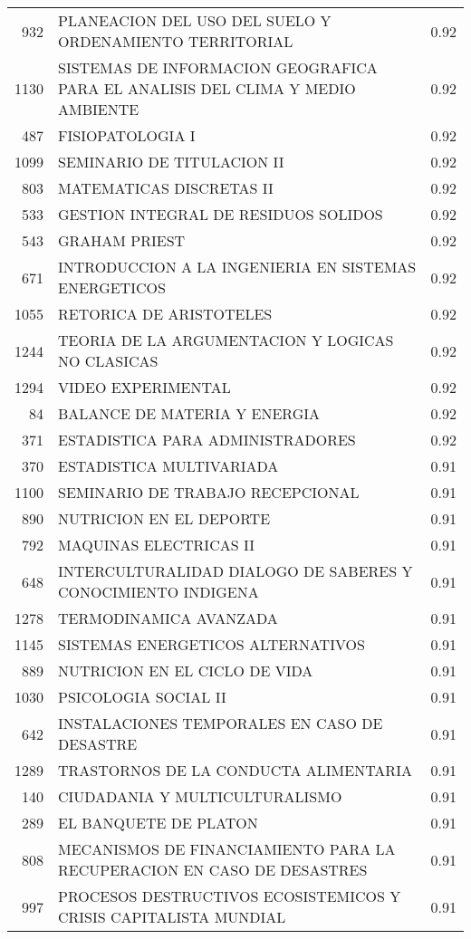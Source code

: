 \begin{table}[ht]
\begin{tabular}{rlr}
  932 & PLANEACION DEL USO DEL SUELO Y ORDENAMIENTO TERRITORIAL & 0.92 \\ 
  1130 & SISTEMAS DE INFORMACION GEOGRAFICA PARA EL ANALISIS DEL CLIMA Y MEDIO AMBIENTE & 0.92 \\ 
  487 & FISIOPATOLOGIA I & 0.92 \\ 
  1099 & SEMINARIO DE TITULACION II & 0.92 \\ 
  803 & MATEMATICAS DISCRETAS II & 0.92 \\ 
  533 & GESTION INTEGRAL DE RESIDUOS SOLIDOS & 0.92 \\ 
  543 & GRAHAM PRIEST & 0.92 \\ 
  671 & INTRODUCCION A LA INGENIERIA EN SISTEMAS ENERGETICOS & 0.92 \\ 
  1055 & RETORICA DE ARISTOTELES & 0.92 \\ 
  1244 & TEORIA DE LA ARGUMENTACION Y LOGICAS NO CLASICAS & 0.92 \\ 
  1294 & VIDEO EXPERIMENTAL & 0.92 \\ 
  84 & BALANCE DE MATERIA Y ENERGIA & 0.92 \\ 
  371 & ESTADISTICA PARA ADMINISTRADORES & 0.92 \\ 
  370 & ESTADISTICA MULTIVARIADA & 0.91 \\ 
  1100 & SEMINARIO DE TRABAJO RECEPCIONAL & 0.91 \\ 
  890 & NUTRICION EN EL DEPORTE & 0.91 \\ 
  792 & MAQUINAS ELECTRICAS II & 0.91 \\ 
  648 & INTERCULTURALIDAD DIALOGO DE SABERES Y CONOCIMIENTO INDIGENA & 0.91 \\ 
  1278 & TERMODINAMICA AVANZADA & 0.91 \\ 
  1145 & SISTEMAS ENERGETICOS ALTERNATIVOS & 0.91 \\ 
  889 & NUTRICION EN EL CICLO DE VIDA & 0.91 \\ 
  1030 & PSICOLOGIA SOCIAL II & 0.91 \\ 
  642 & INSTALACIONES TEMPORALES EN CASO DE DESASTRE & 0.91 \\ 
  1289 & TRASTORNOS DE LA CONDUCTA ALIMENTARIA & 0.91 \\ 
  140 & CIUDADANIA Y MULTICULTURALISMO & 0.91 \\ 
  289 & EL BANQUETE DE PLATON & 0.91 \\ 
  808 & MECANISMOS DE FINANCIAMIENTO PARA LA RECUPERACION EN CASO DE DESASTRES & 0.91 \\ 
  997 & PROCESOS DESTRUCTIVOS ECOSISTEMICOS Y CRISIS CAPITALISTA MUNDIAL & 0.91 \\ 

\end{tabular}
\end{table}
